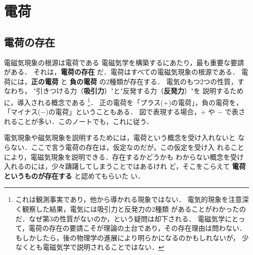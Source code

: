 
\section{電荷}
    \subsection{電荷の存在}
    \begin{mysmallsec}{電磁気現象の根源は電荷である}
    電磁気学を構築するにあたり，最も重要な要請がある．
    それは，\textbf{電荷の存在} だ．電荷はすべての電磁気現象の根源である．
    電荷には，\textbf{正の電荷} と \textbf{負の電荷} の2種類が存在する．
    電気のもつ2つの性質，すなわち，
    "引きつける力（\textbf{吸引力}）"と"反発する力（\textbf{反発力}）"を
    説明するために，導入される概念である
        \footnote{
            これは観測事実であり，他から導かれる現象ではない．
            電気的現象を注意深く観察した結果，電気には吸引力と反発力の2種類
            があることがわかったのだ．なぜ第3の性質がないのか，という疑問は却下される．
            電磁気学にとって，電荷の存在の要請こそが理論の土台であり，その存在理由は問わない．
            もしかしたら，後の物理学の進展により明らかになるのかもしれないが，
            少なくとも電磁気学で説明されることではない．
        }．
    正の電荷を「プラス($+$)の電荷」，負の電荷を，「マイナス($-$)の電荷」ということもある．
    図で表現する場合，$+$ や $-$ で表されることが多い．このノートでも，これに従う．

    電気現象や磁気現象を説明するためには，電荷という概念を受け入れないと
    ならない．ここで言う電荷の存在は，仮定なのだが，この仮定を受け入
    れることにより，電磁気現象を説明できる．存在するかどうかも
    わからない概念を受け入れるのには，少々躊躇してしまうことではあるけれ
    ど，そこをこらえて \textbf{電荷というものが存在する} と認めてもらいた
    い．
    \end{mysmallsec}

